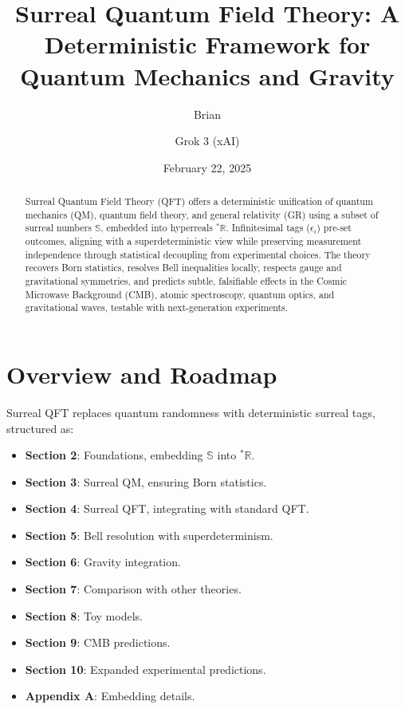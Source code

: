 \documentclass{article}
\begin{document}
\title{Surreal Quantum Field Theory: A Deterministic Framework for Quantum Mechanics and Gravity}
\author{Brian \and Grok 3 (xAI)}
\date{February 22, 2025}
\maketitle

\begin{abstract}
Surreal Quantum Field Theory (QFT) offers a deterministic unification of quantum mechanics (QM), quantum field theory, and general relativity (GR) using a subset of surreal numbers \(\mathbb{S}\), embedded into hyperreals \({}^*\mathbb{R}\). Infinitesimal tags (\(\epsilon_i\)) pre-set outcomes, aligning with a superdeterministic view while preserving measurement independence through statistical decoupling from experimental choices. The theory recovers Born statistics, resolves Bell inequalities locally, respects gauge and gravitational symmetries, and predicts subtle, falsifiable effects in the Cosmic Microwave Background (CMB), atomic spectroscopy, quantum optics, and gravitational waves, testable with next-generation experiments.
\end{abstract}

\section{Overview and Roadmap}
Surreal QFT replaces quantum randomness with deterministic surreal tags, structured as:
\begin{itemize}
    \item \textbf{Section 2}: Foundations, embedding \(\mathbb{S}\) into \({}^*\mathbb{R}\).
    \item \textbf{Section 3}: Surreal QM, ensuring Born statistics.
    \item \textbf{Section 4}: Surreal QFT, integrating with standard QFT.
    \item \textbf{Section 5}: Bell resolution with superdeterminism.
    \item \textbf{Section 6}: Gravity integration.
    \item \textbf{Section 7}: Comparison with other theories.
    \item \textbf{Section 8}: Toy models.
    \item \textbf{Section 9}: CMB predictions.
    \item \textbf{Section 10}: Expanded experimental predictions.
    \item \textbf{Appendix A}: Embedding details.
\end{itemize}
\end{document}
